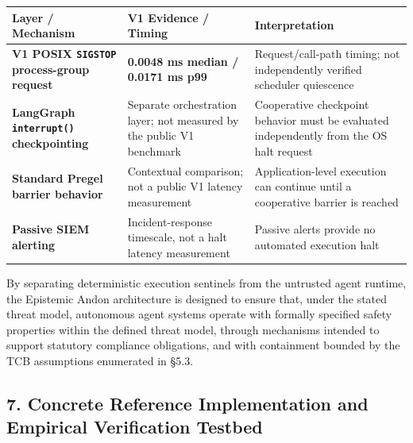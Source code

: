 \documentclass[
  10pt,letterpaper]{article}
\begin{document}
\begin{table}[htbp]
\centering
\begin{tabular}{@{}
  >{\raggedright\arraybackslash}p{}
  >{\centering\arraybackslash}p{}
  >{\raggedright\arraybackslash}p{}@{}}
\toprule\noalign{}
\begin{minipage}[b]{\linewidth}\raggedright
Layer / Mechanism
\end{minipage} & \begin{minipage}[b]{\linewidth}\centering
V1 Evidence / Timing
\end{minipage} & \begin{minipage}[b]{\linewidth}\raggedright
Interpretation
\end{minipage} \\
\midrule\noalign{}

\bottomrule\noalign{}

\textbf{V1 POSIX \texttt{SIGSTOP} process-group request} &
\textbf{0.0048 ms median / 0.0171 ms p99} & Request/call-path timing;
not independently verified scheduler quiescence \\
\textbf{LangGraph \texttt{interrupt()} checkpointing} & Separate
orchestration layer; not measured by the public V1 benchmark & Cooperative
checkpoint behavior must be evaluated independently from the OS halt request \\
\textbf{Standard Pregel barrier behavior} & Contextual comparison; not a
public V1 latency measurement & Application-level execution can continue until
a cooperative barrier is reached \\
\textbf{Passive SIEM alerting} & Incident-response timescale, not a halt
latency measurement & Passive alerts provide no automated execution halt \\
\end{tabular}
\end{table}

By separating deterministic execution sentinels from the untrusted agent
runtime, the Epistemic Andon architecture is designed to ensure that,
under the stated threat model, autonomous agent systems operate with
formally specified safety properties within the defined threat model,
through mechanisms intended to support statutory compliance obligations,
and with containment bounded by the TCB assumptions enumerated in §5.3.

\subsection{7. Concrete Reference Implementation and Empirical
Verification
Testbed}\label{concrete-reference-implementation-and-empirical-verification-testbed}
\end{document}
